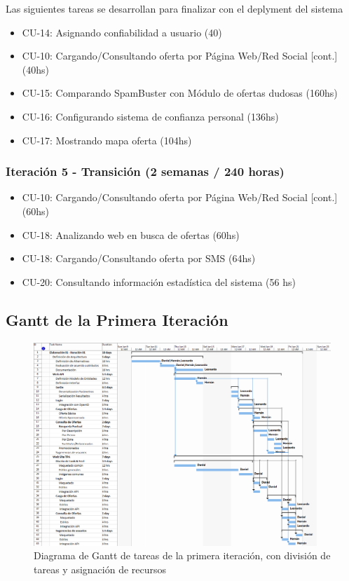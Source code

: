 	Las siguientes tareas se desarrollan para finalizar con el deplyment del sistema
	
	\begin{itemize}
	  	  \item CU-14: Asignando confiabilidad a usuario (40)
		  \item CU-10: Cargando/Consultando oferta por P\'agina Web/Red Social [cont.] (40hs)
		  \item CU-15: Comparando SpamBuster con M\'odulo de ofertas dudosas (160hs)
		  \item CU-16: Configurando sistema de confianza personal (136hs)
		  \item CU-17: Mostrando mapa oferta (104hs)
	\end{itemize}

\subsubsection{Iteraci\'on 5 - Transici\'on (2 semanas / 240 horas)}
	
	\begin{itemize}
		  \item CU-10: Cargando/Consultando oferta por P\'agina Web/Red Social [cont.] (60hs)
		  \item CU-18: Analizando web en busca de ofertas (60hs)
		  \item CU-18: Cargando/Consultando oferta por SMS (64hs)
		  \item CU-20: Consultando información estadística del sistema (56 hs)
	\end{itemize}

\subsection*{Gantt de la Primera Iteración}
\begin{figure}[hbtp]
\centering
\includegraphics[height=0.75\textheight,angle=90]{TP2Planificacion}
\caption{Diagrama de Gantt de tareas de la primera iteraci\'on, con divisi\'on de tareas y asignaci\'on de recursos}
\label{fig:gantt}
\end{figure}
